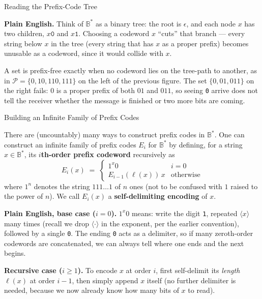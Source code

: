 \documentclass[aspectratio=169,10pt]{beamer}
\newcommand{\Bs}{\mathbb{B}^{*}}
\newcommand{\len}{\ell}
\newcommand{\bij}[1]{\langle #1\rangle}
\begin{document}
\begin{frame}{Reading the Prefix-Code Tree}

\textbf{Plain English.} Think of $\Bs$ as a binary tree: the root is
$\epsilon$, and each node $x$ has two children, $x\texttt{0}$ and
$x\texttt{1}$. Choosing a codeword $x$ ``cuts'' that branch --- every
string below $x$ in the tree (every string that has $x$ as a proper
prefix) becomes unusable as a codeword, since it would collide with $x$.

\medskip
A set is prefix-free exactly when no codeword lies on the tree-path to
another, as in $\mathcal{P}=\{0,10,110,111\}$ on the left of the previous
figure. The set $\{0,01,011\}$ on the right fails: $0$ is a proper prefix
of both $01$ and $011$, so seeing \texttt{0} arrive does not tell the
receiver whether the message is finished or two more bits are coming.
\end{frame}

\begin{frame}{Building an Infinite Family of Prefix Codes}

There are (uncountably) many ways to construct prefix codes in $\Bs$. One
can construct an infinite family of prefix codes $E_i$ for $\Bs$ by
defining, for a string $x\in\Bs$, its \textbf{$i$th-order prefix codeword}
recursively as
\[
  E_i(x) \;=\;
  \begin{cases}
    1^{x}0 & i=0 \\
    E_{i-1}(\len(x))\,x & \text{otherwise}
  \end{cases}
  \tag{2.1.4}
\]
where $1^n$ denotes the string $111\dots1$ of $n$ ones (not to be confused
with $1$ raised to the power of $n$). We call $E_i(x)$ a
\textbf{self-delimiting encoding} of $x$.

\medskip
\textbf{Plain English, base case ($i=0$).} $1^x0$ means: write the digit
\texttt{1}, repeated $\bij{x}$ many times (recall we drop $\bij{\cdot}$ in
the exponent, per the earlier convention), followed by a single
\texttt{0}. The ending \texttt{0} acts as a delimiter, so if many
zeroth-order codewords are concatenated, we can always tell where one ends
and the next begins.

\medskip
\textbf{Recursive case ($i\geq1$).} To encode $x$ at order $i$, first
self-delimit its \emph{length} $\len(x)$ at order $i-1$, then simply append
$x$ itself (no further delimiter is needed, because we now already know
how many bits of $x$ to read).
\end{frame}
\end{document}
